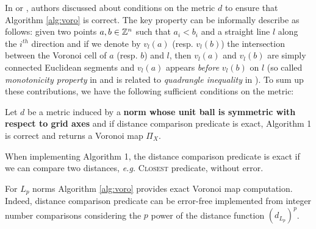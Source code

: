 \documentclass{llncs}
\begin{document}
In \cite{Hirata} or \cite{Maurer2003}, authors discussed about
conditions on the metric $d$ to ensure that Algorithm \ref{alg:voro}
is correct. The key property can be informally describe as follows:
given two points $a,b\in{\mathbb{Z}}^n$ such that $a_i<b_i$ and a straight line
$l$ along the $i^{th}$ direction and if we denote by $v_l(a)$
(resp. $v_l(b)$) the intersection between the Voronoi cell of $a$
(resp. $b$) and $l$, then $v_l(a)$ and $v_l(b)$ are simply connected
Euclidean segments and $v_l(a)$ appears \emph{before} $v_l(b)$ on $l$
(so called \emph{monotonicity property} in \cite{Maurer2003} and is
related to \emph{quadrangle inequality} in \cite{Hirata}).  To sum
up these contributions, we have the following sufficient conditions on
the metric:
\begin{proposition}
\label{prop:voronoi-map-from-1}
  Let $d$ be a metric induced by a \textbf{norm whose unit ball is
    symmetric with respect to grid axes} and if distance comparison
  predicate is exact, Algorithm 1 is correct and returns a Voronoi map
  $\Pi_X$.
\end{proposition}
When implementing Algorithm 1, the distance comparison
predicate is exact if we can compare two distances, \emph{e.g.}
\textsc{Closest} predicate, without error.

For $L_p$ norms Algorithm \ref{alg:voro} provides exact Voronoi map
computation. Indeed, distance comparison predicate can be error-free implemented
 from integer number comparisons considering the $p$ power of
the distance function $\left (d_{L_p}\right)^p$.
\end{document}
